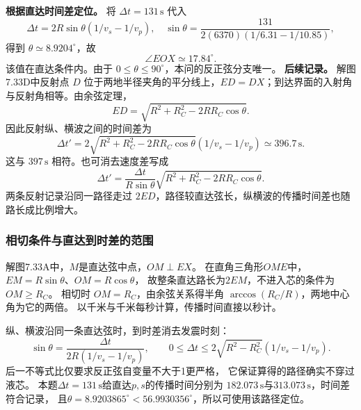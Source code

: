 \documentclass[UTF8,fontset=fandol,a4paper,11pt]{ctexart}
\newcommand{\figcaption}[1]{\par\vspace{2pt}{\small\color{muted}#1}\par}
\begin{document}
\textbf{根据直达时间差定位。} 将 $\Delta t=131\,\mathrm s$ 代入
\[\Delta t=2R\sin\theta(1/v_s-1/v_p),\quad
\sin\theta=\frac{131}{2(6370)(1/6.31-1/10.85)},\]
得到 $\theta\simeq8.9204^\circ$，故
\[\boxed{\angle EOX\simeq17.84^\circ.}\]
该值在直达条件内。由于 $0\le\theta\le90^\circ$，本问的反正弦分支唯一。
\textbf{后续记录。} 解图7.33D中反射点 $D$ 位于两地半径夹角的平分线上，$ED=DX$；到达界面的入射角与反射角相等。由余弦定理，
\[ED=\sqrt{R^2+R_C^2-2RR_C\cos\theta}.\]
因此反射纵、横波之间的时间差为
\[\boxed{\Delta t'=2\sqrt{R^2+R_C^2-2RR_C\cos\theta}
(1/v_s-1/v_p)\simeq396.7\,\mathrm s.}\]
这与 $397\,\mathrm s$ 相符。也可消去速度差写成
\[\Delta t'=\frac{\Delta t}{R\sin\theta}
\sqrt{R^2+R_C^2-2RR_C\cos\theta}.\]
两条反射记录沿同一路径走过 $2ED$，路径较直达弦长，纵横波的传播时间差也随路长成比例增大。
\begin{center}\begin{minipage}{\linewidth}\centering{}\figcaption{解图 7.33D}\end{minipage}\end{center}
\subsubsection*{相切条件与直达到时差的范围}
解图7.33A中，$M$是直达弦中点，$OM\perp EX$。
在直角三角形$OME$中，$EM=R\sin\theta$、$OM=R\cos\theta$，
故整条直达路长为$2EM$，不进入芯的条件为$OM\ge R_C$。
相切时 $OM=R_C$，由余弦关系得半角 $\arccos(R_C/R)$，两地中心角为它的两倍。
以千米与千米每秒计算，传播时间直接以秒计。

纵、横波沿同一条直达弦时，到时差消去发震时刻：
\[
\sin\theta=\frac{\Delta t}{2R(1/v_s-1/v_p)},\qquad
0\le\Delta t\le2\sqrt{R^2-R_C^2}(1/v_s-1/v_p).
\]
后一不等式比仅要求反正弦自变量不大于1更严格，
它保证算得的路径确实不穿过液芯。
本题$\Delta t=131\,\mathrm s$给直达$p,s$的传播时间分别为
$182.073\,\mathrm s$与$313.073\,\mathrm s$，时间差符合记录，
且$\theta=8.9203865^\circ<56.9930356^\circ$，所以可使用该路径定位。
\end{document}
